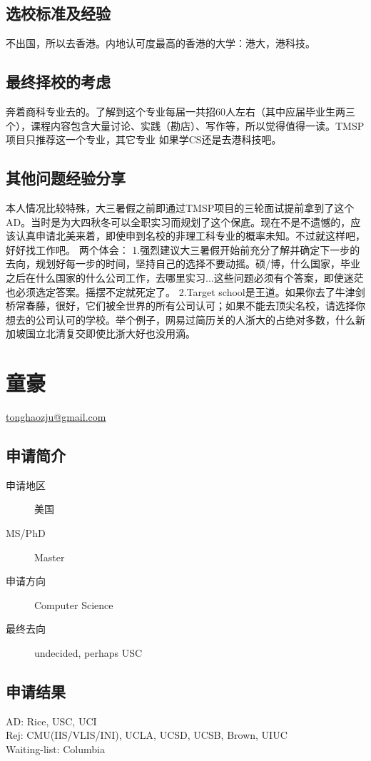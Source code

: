 \documentclass[11pt,fleqn,openany]{book} %
\begin{document}
\subsection*{选校标准及经验}
不出国，所以去香港。内地认可度最高的香港的大学：港大，港科技。
\subsection*{最终择校的考虑}
奔着商科专业去的。了解到这个专业每届一共招60人左右（其中应届毕业生两三个），课程内容包含大量讨论、实践（勘店）、写作等，所以觉得值得一读。TMSP项目只推荐这一个专业，其它专业
如果学CS还是去港科技吧。
\subsection*{其他问题经验分享}
本人情况比较特殊，大三暑假之前即通过TMSP项目的三轮面试提前拿到了这个AD。当时是为大四秋冬可以全职实习而规划了这个保底。现在不是不遗憾的，应该认真申请北美来着，即使申到名校的非理工科专业的概率未知。不过就这样吧，好好找工作吧。
两个体会：
1.强烈建议大三暑假开始前充分了解并确定下一步的去向，规划好每一步的时间，坚持自己的选择不要动摇。硕/博，什么国家，毕业之后在什么国家的什么公司工作，去哪里实习...这些问题必须有个答案，即使迷茫也必须选定答案。摇摆不定就死定了。
2.Target school是王道。如果你去了牛津剑桥常春藤，很好，它们被全世界的所有公司认可；如果不能去顶尖名校，请选择你想去的公司认可的学校。举个例子，网易过简历关的人浙大的占绝对多数，什么新加坡国立北清复交即使比浙大好也没用滴。
\clearpage
\section{童豪}
\hfill \href{mailto:tonghaozju@gmail.com}{tonghaozju@gmail.com}

\noindent\begin{minipage}[t]{0.45\textwidth}
\subsection*{申请简介}
\begin{description}
\item[申请地区] 美国
\item[MS/PhD] Master
\item[申请方向] Computer Science
\item[最终去向] undecided, perhaps USC
\end{description}
\end{minipage}
\hfill
\begin{minipage}[t]{0.45\textwidth}
\subsection*{申请结果}
\noindent AD: Rice, USC, UCI\\
Rej: CMU(IIS/VLIS/INI), UCLA, UCSD, UCSB, Brown, UIUC\\
Waiting-list: Columbia
\end{minipage}
\end{document}
